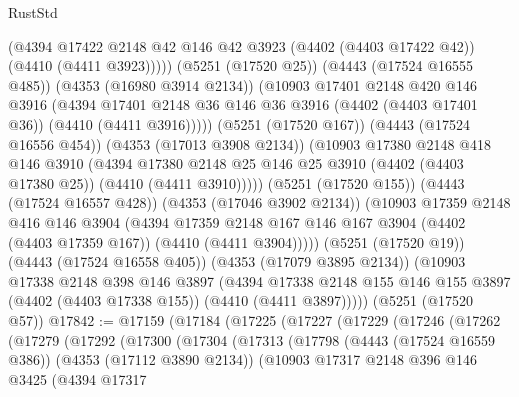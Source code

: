 \begin{lexlean}{RustStd}
\begin{coremodule}
                (@4394
                  @17422
                  @2148
                  @42
                  @146
                  @42
                  @3923
                  (@4402 (@4403 @17422 @42))
                  (@4410 (@4411 @3923)))))
            (@5251 (@17520 @25))
            (@4443 (@17524 @16555 @485))
            (@4353 (@16980 @3914 @2134))
            (@10903
              @17401
              @2148
              @420
              @146
              @3916
              (@4394
                @17401
                @2148
                @36
                @146
                @36
                @3916
                (@4402 (@4403 @17401 @36))
                (@4410 (@4411 @3916)))))
          (@5251 (@17520 @167))
          (@4443 (@17524 @16556 @454))
          (@4353 (@17013 @3908 @2134))
          (@10903
            @17380
            @2148
            @418
            @146
            @3910
            (@4394
              @17380
              @2148
              @25
              @146
              @25
              @3910
              (@4402 (@4403 @17380 @25))
              (@4410 (@4411 @3910)))))
        (@5251 (@17520 @155))
        (@4443 (@17524 @16557 @428))
        (@4353 (@17046 @3902 @2134))
        (@10903
          @17359
          @2148
          @416
          @146
          @3904
          (@4394
            @17359
            @2148
            @167
            @146
            @167
            @3904
            (@4402 (@4403 @17359 @167))
            (@4410 (@4411 @3904)))))
      (@5251 (@17520 @19))
      (@4443 (@17524 @16558 @405))
      (@4353 (@17079 @3895 @2134))
      (@10903
        @17338
        @2148
        @398
        @146
        @3897
        (@4394
          @17338
          @2148
          @155
          @146
          @155
          @3897
          (@4402 (@4403 @17338 @155))
          (@4410 (@4411 @3897)))))
    (@5251 (@17520 @57))
@17842 := @17159
    (@17184
      (@17225
        (@17227
          (@17229
            (@17246
              (@17262
                (@17279
                  (@17292
                    (@17300
                      (@17304
                        (@17313
                          (@17798
                            (@4443 (@17524 @16559 @386))
                            (@4353 (@17112 @3890 @2134))
                            (@10903
                              @17317
                              @2148
                              @396
                              @146
                              @3425
                              (@4394
                                @17317

\end{coremodule}
\end{lexlean}
